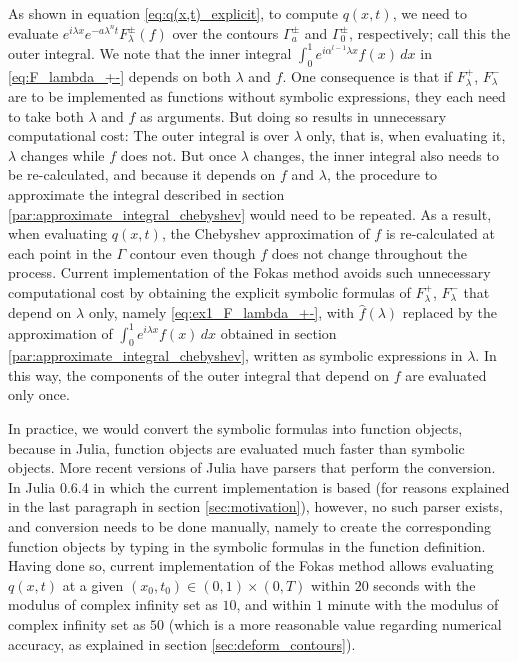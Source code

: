 \documentclass[12pt, oneside, a4paper]{article}
\begin{document}
As shown in equation \eqref{eq:q(x,t)_explicit}, to compute $q(x,t)$, we need to evaluate $e^{i\lambda x}e^{-a\lambda^n t}F_\lambda^\pm(f)$ over the contours $\Gamma_a^\pm$ and $\Gamma_0^\pm$, respectively; call this the outer integral. We note that the inner integral $\int_0^1 e^{i\alpha^{l-1}\lambda x}f(x)\,dx$ in \eqref{eq:F_lambda_+-} depends on both $\lambda$ and $f$. One consequence is that if $F_\lambda^+$, $F_\lambda^-$ are to be implemented as functions without symbolic expressions, they each need to take both $\lambda$ and $f$ as arguments. But doing so results in unnecessary computational cost: The outer integral is over $\lambda$ only, that is, when evaluating it, $\lambda$ changes while $f$ does not. But once $\lambda$ changes, the inner integral also needs to be re-calculated, and because it depends on $f$ and $\lambda$, the procedure to approximate the integral described in section \ref{par:approximate_integral_chebyshev} would need to be repeated. As a result, when evaluating $q(x,t)$, the Chebyshev approximation of $f$ is re-calculated at each point in the $\Gamma$ contour even though $f$ does not change throughout the process. Current implementation of the Fokas method avoids such unnecessary computational cost by obtaining the explicit symbolic formulas of $F_\lambda^+$, $F_\lambda^-$ that depend on $\lambda$ only, namely \eqref{eq:ex1_F_lambda_+-}, with $\hat{f}(\lambda)$ replaced by the approximation of $\int_0^1 e^{i\lambda x}f(x)\,dx$ obtained in section \ref{par:approximate_integral_chebyshev}, written as symbolic expressions in $\lambda$. In this way, the components of the outer integral that depend on $f$ are evaluated only once.

In practice, we would convert the symbolic formulas into function objects, because in Julia, function objects are evaluated much faster than symbolic objects. More recent versions of Julia have parsers that perform the conversion. In Julia 0.6.4 in which the current implementation is based (for reasons explained in the last paragraph in section \ref{sec:motivation}), however, no such parser exists, and conversion needs to be done manually, namely to create the corresponding function objects by typing in the symbolic formulas in the function definition. Having done so, current implementation of the Fokas method allows evaluating $q(x,t)$ at a given $(x_0, t_0)\in (0,1)\times (0,T)$ within $20$ seconds with the modulus of complex infinity set as $10$, and within $1$ minute with the modulus of complex infinity set as $50$ (which is a more reasonable value regarding numerical accuracy, as explained in section \ref{sec:deform_contours}).
\end{document}
